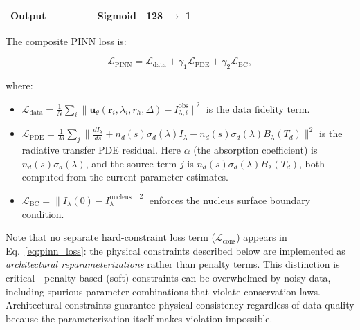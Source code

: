 \documentclass[usenatbib]{mnras}
\newcommand{\tablecomments}[1]{\vspace{4pt}{\footnotesize #1}\vspace{2pt}}
\begin{document}
\begin{table}
\begin{tabular}{lcccc}
\hspace{1em}Output & --- & --- & Sigmoid & 128 $\to$ 1 \\
\bottomrule
\end{tabular}
\tablecomments{The physics network uses a Fourier feature mapping (sin/cos projection with $\sigma = 10$) for high-frequency spatial variations. Swish activation: $x \cdot \sigma(x)$. The inversion network processes imaging with a strided convolutional encoder (4 downsampling blocks, channels [64, 128, 256, 512]) before the cross-modal attention fusion. Full implementation details, including skip connections in the convolutional encoder and the exact dimension flattening operations, are provided in the public code repository.}
\end{table}


The composite PINN loss is:

\begin{equation}\label{eq:pinn_loss}
\mathcal{L}_{\text{PINN}} = \mathcal{L}_{\text{data}} + \gamma_1 \mathcal{L}_{\text{PDE}} + \gamma_2 \mathcal{L}_{\text{BC}},
\end{equation}

where:
\begin{itemize}
    \item $\mathcal{L}_{\text{data}} = \frac{1}{N}\sum_i \|\mathbf{u}_\theta(\mathbf{r}_i, \lambda_i, r_h, \Delta) - I_{\lambda,i}^{\text{obs}}\|^2$ is the data fidelity term.
    \item $\mathcal{L}_{\text{PDE}} = \frac{1}{M}\sum_j \|\frac{d I_\lambda}{ds} + n_d(s)\sigma_d(\lambda) I_\lambda - n_d(s)\sigma_d(\lambda) B_\lambda(T_d)\|^2$ is the radiative transfer PDE residual. Here $\alpha$ (the absorption coefficient) is $n_d(s)\sigma_d(\lambda)$, and the source term $j$ is $n_d(s)\sigma_d(\lambda)B_\lambda(T_d)$, both computed from the current parameter estimates.
    \item $\mathcal{L}_{\text{BC}} = \|I_\lambda(0) - I_{\lambda}^{\text{nucleus}}\|^2$ enforces the nucleus surface boundary condition.
\end{itemize}

Note that no separate hard-constraint loss term ($\mathcal{L}_{\text{cons}}$) appears in Eq.~\ref{eq:pinn_loss}: the physical constraints described below are implemented as \textit{architectural reparameterizations} rather than penalty terms. This distinction is critical---penalty-based (soft) constraints can be overwhelmed by noisy data, including spurious parameter combinations that violate conservation laws. Architectural constraints guarantee physical consistency regardless of data quality because the parameterization itself makes violation impossible.
\end{document}
